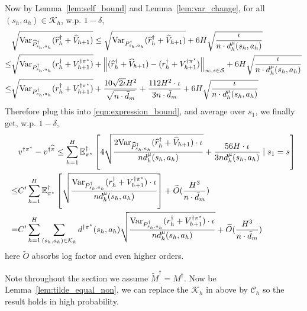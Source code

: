 Now by Lemma~\ref{lem:self_bound} and Lemma~\ref{lem:var_change}, for all $(s_h,a_h)\in\mathcal{K}_h$, w.p. $1-\delta$,
\begin{align*}
&\sqrt{\mathrm{Var}_{\widehat{P}^\dagger_{s_h,a_h}}(\widehat{r}^\dagger_h+\widehat{V}_{h+1})}\leq \sqrt{\mathrm{Var}_{{P}^\dagger_{s_h,a_h}}(\widehat{r}^\dagger_h+\widehat{V}_{h+1})}+6H \sqrt{\frac{\iota}{n\cdot d^\mu_h(s_h,a_h)}}\\
\leq &\sqrt{\mathrm{Var}_{{P}^\dagger_{s_h,a_h}}({r}^\dagger_h+{V}^{\dagger\pi^\star}_{h+1})}+\left\lVert(\widehat{r}^\dagger_h+\widehat{V}_{h+1})-({r}^\dagger_h+{V}^{\dagger\pi^\star}_{h+1})\right\rVert_{\infty,s\in\mathcal{S}}+6H \sqrt{\frac{\iota}{n\cdot d^\mu_h(s_h,a_h)}}\\
\leq&\sqrt{\mathrm{Var}_{{P}^\dagger_{s_h,a_h}}({r}^\dagger_h+{V}^{\dagger\pi^\star}_{h+1})}+\frac{10\sqrt{2\iota}H^2}{\sqrt{n\cdot\bar{d}_m}} +\frac{112H^2\cdot \iota}{3n\cdot \bar{d}_m}+6H \sqrt{\frac{\iota}{n\cdot d^\mu_h(s_h,a_h)}}\\
\end{align*}
Therefore plug this into \eqref{eqn:expression_bound}, and average over $s_1$, we finally get, w.p. $1-\delta$,
	\begin{align*}
	&v^{\dagger\pi^\star}-v^{\dagger\widehat{\pi}}\leq 
	\sum_{h=1}^H\mathbb{E}^\dagger_{\pi^\star}\left[4\sqrt{\frac{2\mathrm{Var}_{\widehat{P}^\dagger_{s_h,a_h}}(\widehat{r}^\dagger_h+\widehat{V}_{h+1})\cdot\iota}{nd^\mu_h(s_h,a_h)}}+\frac{56H\cdot\iota}{3nd^\mu_h(s_h,a_h)}\mid s_1=s\right]\\
	\leq& C'\sum_{h=1}^H\mathbb{E}^\dagger_{\pi^\star}\left[\sqrt{\frac{\mathrm{Var}_{{P}^\dagger_{s_h,a_h}}({r}^\dagger_h+{V}^{\dagger\pi^\star}_{h+1})\cdot\iota}{nd^\mu_h(s_h,a_h)}}\right]+\widetilde{O}(\frac{H^3}{n\cdot\bar{d}_m})\\
	=&C'\sum_{h=1}^H\sum_{(s_h,a_h)\in\mathcal{K}_h}d^{\dagger\pi^\star}(s_h,a_h)\sqrt{\frac{\mathrm{Var}_{{P}^\dagger_{s_h,a_h}}({r}^\dagger_h+{V}^{\dagger\pi^\star}_{h+1})\cdot\iota}{nd^\mu_h(s_h,a_h)}}+\widetilde{O}(\frac{H^3}{n\cdot\bar{d}_m})\\
\end{align*}
here $\widetilde{O}$ absorbs log factor and even higher orders. 

Note throughout the section we assume $\widetilde{M}^\dagger={M}^\dagger$. Now be Lemma~\ref{lem:tilde_equal_non}, we can replace the $\mathcal{K}_h$ in above by $\mathcal{C}_h$ so the result holds in high probability.

